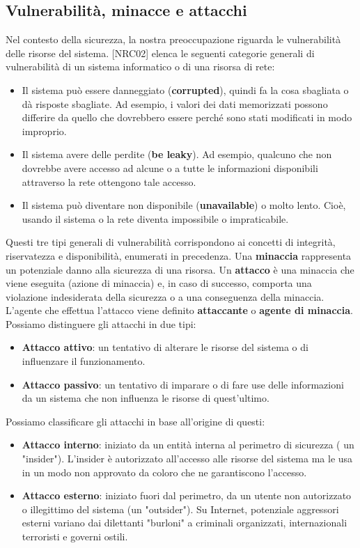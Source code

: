 \subsection{Vulnerabilità, minacce e attacchi}
Nel contesto della sicurezza, la nostra preoccupazione riguarda le vulnerabilità delle risorse del sistema. [NRC02] elenca le seguenti categorie generali di vulnerabilità di un sistema informatico o di una risorsa di rete:
\begin{itemize}
    \item Il sistema può essere danneggiato (\textbf{corrupted}), quindi fa la cosa sbagliata o dà risposte sbagliate. Ad esempio, i valori dei dati memorizzati possono differire da quello che dovrebbero essere perché sono stati modificati in modo improprio.
    \item Il sistema avere delle perdite (\textbf{be leaky}). Ad esempio, qualcuno che non dovrebbe avere accesso ad alcune o a tutte le informazioni disponibili attraverso la rete ottengono tale accesso.
    \item Il sistema può diventare non disponibile (\textbf{unavailable}) o molto lento. Cioè, usando il sistema o la rete diventa impossibile o impraticabile.
\end{itemize}
Questi tre tipi generali di vulnerabilità corrispondono ai concetti di integrità, riservatezza e disponibilità, enumerati in precedenza. Una \textbf{minaccia} rappresenta un potenziale danno alla sicurezza di una risorsa. Un \textbf{attacco} è una minaccia che viene eseguita (azione di minaccia) e, in caso di successo, comporta una violazione indesiderata della sicurezza o a una conseguenza della minaccia. L'agente che effettua l'attacco viene definito \textbf{attaccante} o \textbf{agente di minaccia}. Possiamo distinguere gli attacchi in due tipi:
\begin{itemize}
    \item \textbf{Attacco attivo}: un tentativo di alterare le risorse del sistema o di influenzare il funzionamento.
    \item \textbf{Attacco passivo}: un tentativo di imparare o di fare use delle informazioni da un sistema che non influenza le risorse di quest'ultimo.
\end{itemize}

\noindent
Possiamo classificare gli attacchi in base all'origine di questi:
\begin{itemize}
    \item \textbf{Attacco interno}: iniziato da un entità interna al perimetro di sicurezza ( un "insider"). L'insider è autorizzato all'accesso alle risorse del sistema ma le usa in un modo non approvato da coloro che ne garantiscono l'accesso.  
    \item \textbf{Attacco esterno}: iniziato fuori dal perimetro, da un utente non autorizzato o illegittimo del sistema (un "outsider"). Su Internet, potenziale aggressori esterni variano dai dilettanti "burloni" a criminali organizzati, internazionali terroristi e governi ostili.
\end{itemize}

